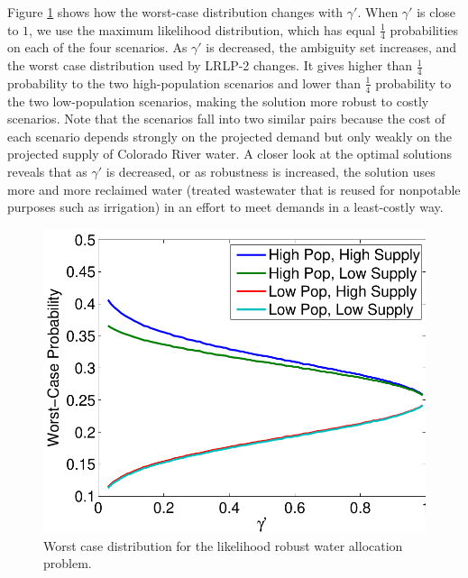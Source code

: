 \documentclass{iserc}
\begin{document}
Figure \ref{fig:worst_case} shows how the worst-case distribution changes with $\gamma'$.
When $\gamma'$ is close to $1$, we use the maximum likelihood distribution, which has equal $\tfrac{1}{4}$ probabilities on each of the four scenarios.
As $\gamma'$ is decreased, the ambiguity set increases, and the worst case distribution used by LRLP-2 changes.
It gives higher than $\tfrac{1}{4}$ probability to the two high-population scenarios and lower than $\tfrac{1}{4}$ probability to the two low-population scenarios, making the solution more robust to costly scenarios.
Note that the scenarios fall into two similar pairs because the cost of each scenario depends strongly on the projected demand but only weakly on the projected supply of Colorado River water.
A closer look at the optimal solutions reveals that as $\gamma'$ is decreased, or as robustness is increased, the solution uses more and more reclaimed water (treated wastewater that is reused for nonpotable purposes such as irrigation) in an effort to meet demands in a least-costly way.

\begin{figure}
	\centering
	\includegraphics[width=.5\textwidth]{images/worst_case_probability}
	\caption{Worst case distribution for the likelihood robust water allocation problem.}
	\label{fig:worst_case}
\end{figure}

\end{document}
